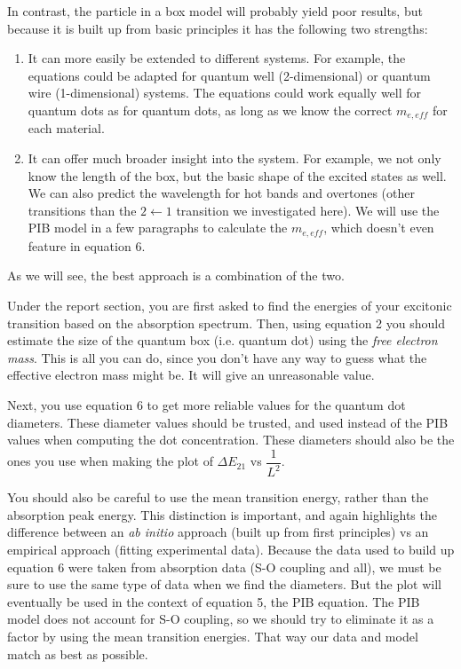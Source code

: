 \documentclass[12pt, openany, letterpaper]{memoir}
\begin{document}
In contrast, the particle in a box model will probably yield poor results, but because it is built up from basic principles it has the following two strengths:
\begin{enumerate}
	\item It can more easily be extended to different systems. For example, the equations could be adapted for quantum well (2-dimensional) or quantum wire (1-dimensional) systems. The equations could work equally well for  quantum dots as for  quantum dots, as long as we know the correct $m_{e,eff}$ for each material.
	\item It can offer much broader insight into the system. For example, we not only know the length of the box, but the basic shape of the excited states as well. We can also predict the wavelength for hot bands and overtones (other transitions than the $2\leftarrow1$ transition we investigated here). We will use the PIB model in a few paragraphs to calculate the $m_{e,eff}$, which doesn't even feature in equation 6.
\end{enumerate}

As we will see, the best approach is a combination of the two.

Under the report section, you are first asked to find the energies of your excitonic transition based on the absorption spectrum. Then, using equation 2 you should estimate the size of the quantum box (i.e. quantum dot) using the \emph{free electron mass}. This is all you can do, since you don't have any way to guess what the effective electron mass might be. It will give an unreasonable value.

Next, you use equation 6 to get more reliable values for the quantum dot diameters. These diameter values should be trusted, and used instead of the PIB values when computing the dot concentration. These diameters should also be the ones you use when making the plot of $\Delta E_{21}$ vs $\dfrac{1}{L^2}$. 

You should also be careful to use the mean transition energy, rather than the absorption peak energy. This distinction is important, and again highlights the difference between an \emph{ab initio} approach (built up from first principles) vs an empirical approach (fitting experimental data). Because the data used to build up equation 6 were taken from absorption data (S-O coupling and all), we must be sure to use the same type of data when we find the diameters. But the plot will eventually be used in the context of equation 5, the PIB equation. The PIB model does not account for S-O coupling, so we should try to eliminate it as a factor by using the mean transition energies. That way our data and model match as best as possible.
\end{document}
